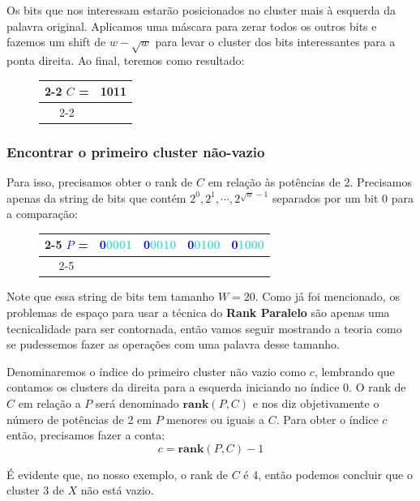 Os bits que nos interessam estarão posicionados no cluster mais à esquerda da
palavra original. Aplicamos uma máscara para zerar todos os outros bits e
fazemos um shift de $w-\sqrt{w}$ para levar o cluster dos bits interessantes
para a ponta direita. Ao final, teremos como resultado:

\begin{figure}[h]
 \bf \Large\centering
 \begin{tabular}{c|c|}
\cline{2-2}
\textcolor{PineGreen}{$C$} = &
\textcolor{PineGreen}{1011} \\
\cline{2-2}
  \end{tabular}
\end{figure}

\subsubsection{Encontrar o primeiro cluster não-vazio}

Para isso, precisamos obter o rank de $C$ em relação às potências de 2.
Precisamos apenas da string de bits que contém ${2^0,2^1,\cdots,2^{\sqrt{w}-1}}$
separados por um bit 0 para a comparação:

\begin{figure}[h]
 \bf \Large\centering
 \begin{tabular}{c|cccc|}
\cline{2-5}
\textcolor{Blue}{$P$} = &
\textcolor{Blue}{0}\textcolor{Turquoise}{0001} &
\textcolor{Blue}{0}\textcolor{Turquoise}{0010} &
\textcolor{Blue}{0}\textcolor{Turquoise}{0100} &
\textcolor{Blue}{0}\textcolor{Turquoise}{1000} \\
\cline{2-5}
  \end{tabular}
\end{figure}

Note que essa string de bits tem tamanho $W=20$. Como já foi mencionado, os
problemas de espaço para usar a técnica do \textbf{Rank Paralelo} são apenas uma
tecnicalidade para ser contornada, então vamos seguir mostrando a teoria como se
pudessemos fazer as operações com uma palavra desse tamanho.

Denominaremos o índice do primeiro cluster não vazio como $c$, lembrando que
contamos os clusters da direita para a esquerda iniciando no índice 0. O rank de
$C$ em relação a $P$ será denominado $\textbf{rank}(P,C)$ e nos diz
objetivamente o número de potências de 2 em $P$ menores ou iguais a $C$. Para
obter o índice $c$ então, precisamos fazer a conta:
\[
c=\textbf{rank}(P,C)-1
\]

É evidente que, no nosso exemplo, o rank de $C$ é 4, então podemos concluir que
o cluster 3 de $X$ não está vazio.

